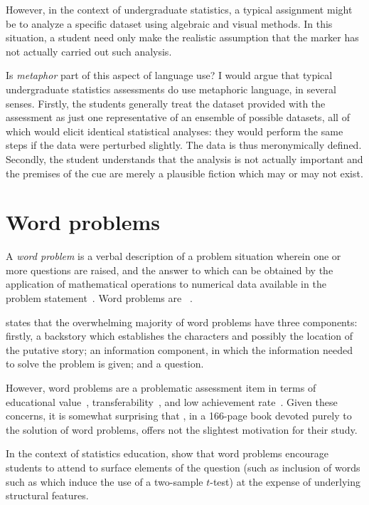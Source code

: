 However, in the context of undergraduate statistics, a typical
assignment might be to analyze a specific dataset using algebraic and
visual methods.  In this situation, a student need only make the
realistic assumption that the marker has not actually carried out such
analysis.

Is \emph{metaphor} part of this aspect of language use?  I would argue
that typical undergraduate statistics assessments do use metaphoric
language, in several senses.  Firstly, the students generally treat
the dataset provided with the assessment as just one representative of
an ensemble of possible datasets, all of which would elicit identical
statistical analyses: they would perform the same steps if the data
were perturbed slightly.  The data is thus meronymically defined.
Secondly, the student understands that the analysis is not actually
important and the premises of the cue are merely a plausible fiction
which may or may not exist.

\section{Word problems}

A \emph{word problem} is a verbal description of a problem situation
wherein one or more questions are raised, and the answer to which can
be obtained by the application of mathematical operations to numerical
data available in the problem statement~\citep{verschaffel2014}.  Word
problems are ~\citep{reusser1997}.

 states that the overwhelming majority of word
problems have three components: firstly, a backstory which establishes
the characters and possibly the location of the putative story; an
information component, in which the information needed to solve the
problem is given; and a question.

However, word problems are a problematic assessment item in terms of
educational value~\citep{gerofsky1996},
transferability~\citep{reusser1997}, and low achievement
rate~\citep{cummins1988}.  Given these concerns, it is somewhat
surprising that , in a 166-page book devoted
purely to the solution of word problems, offers not the slightest
motivation for their study.

In the context of statistics education,  show that
word problems encourage students to attend to surface elements of the
question (such as inclusion of words such as  which
induce the use of a two-sample $t$-test) at the expense of underlying
structural features.

